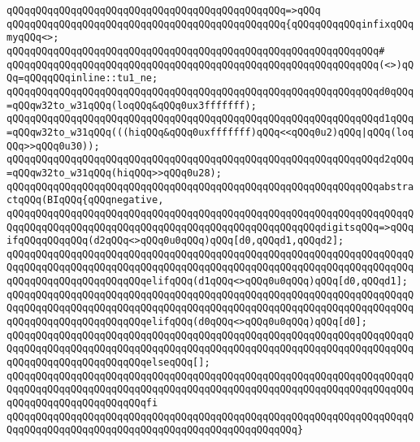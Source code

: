 \verb|qQQqqQQqqQQqqQQqqQQqqQQqqQQqqQQqqQQqqQQqqQQqqQQq=>qQQq|\newline
\verb|qQQqqQQqqQQqqQQqqQQqqQQqqQQqqQQqqQQqqQQqqQQqqQQq{qQQqqQQqqQQqinfixqQQqmyqQQq<>;|\newline
\verb|qQQqqQQqqQQqqQQqqQQqqQQqqQQqqQQqqQQqqQQqqQQqqQQqqQQqqQQqqQQqqQQq#|\newline
\verb|qQQqqQQqqQQqqQQqqQQqqQQqqQQqqQQqqQQqqQQqqQQqqQQqqQQqqQQqqQQqqQQq(<>)qQQq=qQQqqQQqinline::tu1_ne;|\newline
\newline
\verb|qQQqqQQqqQQqqQQqqQQqqQQqqQQqqQQqqQQqqQQqqQQqqQQqqQQqqQQqqQQqqQQqd0qQQq=qQQqw32to_w31qQQq(loqQQq&qQQq0ux3fffffff);|\newline
\verb|qQQqqQQqqQQqqQQqqQQqqQQqqQQqqQQqqQQqqQQqqQQqqQQqqQQqqQQqqQQqqQQqd1qQQq=qQQqw32to_w31qQQq(((hiqQQq&qQQq0uxfffffff)qQQq<<qQQq0u2)qQQq|\verb#|qQQq(loqQQq>>qQQq0u30));#\newline
\verb|qQQqqQQqqQQqqQQqqQQqqQQqqQQqqQQqqQQqqQQqqQQqqQQqqQQqqQQqqQQqqQQqd2qQQq=qQQqw32to_w31qQQq(hiqQQq>>qQQq0u28);|\newline
\newline
\verb|qQQqqQQqqQQqqQQqqQQqqQQqqQQqqQQqqQQqqQQqqQQqqQQqqQQqqQQqqQQqqQQqabstractqQQq(BIqQQq{qQQqnegative,|\newline
\verb|qQQqqQQqqQQqqQQqqQQqqQQqqQQqqQQqqQQqqQQqqQQqqQQqqQQqqQQqqQQqqQQqqQQqqQQqqQQqqQQqqQQqqQQqqQQqqQQqqQQqqQQqqQQqqQQqqQQqqQQqqQQqdigitsqQQq=>qQQqifqQQqqQQqqQQq(d2qQQq<>qQQq0u0qQQq)qQQq[d0,qQQqd1,qQQqd2];|\newline
\verb|qQQqqQQqqQQqqQQqqQQqqQQqqQQqqQQqqQQqqQQqqQQqqQQqqQQqqQQqqQQqqQQqqQQqqQQqqQQqqQQqqQQqqQQqqQQqqQQqqQQqqQQqqQQqqQQqqQQqqQQqqQQqqQQqqQQqqQQqqQQqqQQqqQQqqQQqqQQqqQQqqQQqelifqQQq(d1qQQq<>qQQq0u0qQQq)qQQq[d0,qQQqd1];|\newline
\verb|qQQqqQQqqQQqqQQqqQQqqQQqqQQqqQQqqQQqqQQqqQQqqQQqqQQqqQQqqQQqqQQqqQQqqQQqqQQqqQQqqQQqqQQqqQQqqQQqqQQqqQQqqQQqqQQqqQQqqQQqqQQqqQQqqQQqqQQqqQQqqQQqqQQqqQQqqQQqqQQqqQQqelifqQQq(d0qQQq<>qQQq0u0qQQq)qQQq[d0];|\newline
\verb|qQQqqQQqqQQqqQQqqQQqqQQqqQQqqQQqqQQqqQQqqQQqqQQqqQQqqQQqqQQqqQQqqQQqqQQqqQQqqQQqqQQqqQQqqQQqqQQqqQQqqQQqqQQqqQQqqQQqqQQqqQQqqQQqqQQqqQQqqQQqqQQqqQQqqQQqqQQqqQQqqQQqelseqQQq[];|\newline
\verb|qQQqqQQqqQQqqQQqqQQqqQQqqQQqqQQqqQQqqQQqqQQqqQQqqQQqqQQqqQQqqQQqqQQqqQQqqQQqqQQqqQQqqQQqqQQqqQQqqQQqqQQqqQQqqQQqqQQqqQQqqQQqqQQqqQQqqQQqqQQqqQQqqQQqqQQqqQQqqQQqqQQqfi|\newline
\verb|qQQqqQQqqQQqqQQqqQQqqQQqqQQqqQQqqQQqqQQqqQQqqQQqqQQqqQQqqQQqqQQqqQQqqQQqqQQqqQQqqQQqqQQqqQQqqQQqqQQqqQQqqQQqqQQqqQQqqQQq}|\newline
